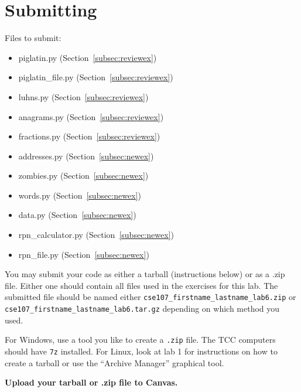\documentclass[11pt]{cselabheader}
\begin{document}
\pagebreak
\section{Submitting}

Files to submit:
\begin{itemize}
  \item piglatin.py (Section~\ref{subsec:reviewex})
  \item piglatin\_file.py (Section~\ref{subsec:reviewex})
  \item luhns.py (Section~\ref{subsec:reviewex})
  \item anagrams.py (Section~\ref{subsec:reviewex})
  \item fractions.py (Section~\ref{subsec:reviewex})
  \item addresses.py (Section~\ref{subsec:newex})
  \item zombies.py (Section~\ref{subsec:newex})
  \item words.py (Section~\ref{subsec:newex})
  \item data.py (Section~\ref{subsec:newex})
  \item rpn\_calculator.py (Section~\ref{subsec:newex})
  \item rpn\_file.py (Section~\ref{subsec:newex})
\end{itemize}

You may submit your code as either a tarball (instructions below) or as a .zip
file. Either one should contain all files used in the exercises for this lab.
The submitted file should be named either
\texttt{cse107\_firstname\_lastname\_lab6.zip} or
\texttt{cse107\_firstname\_lastname\_lab6.tar.gz} depending on which method you
used.

For Windows, use a tool you like to create a \texttt{.zip} file. The TCC
computers should have \texttt{7z} installed. For Linux, look at lab 1 for
instructions on how to create a tarball or use the ``Archive Manager'' graphical
tool.

\begin{center}
  \textbf{Upload your tarball or .zip file to Canvas.}
\end{center}
\end{document}
